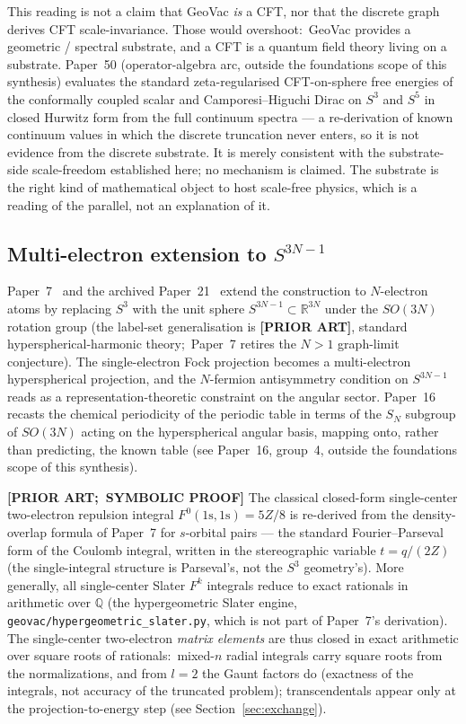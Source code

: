 \documentclass[aps,pra,twocolumn,superscriptaddress,longbibliography]{revtex4-2}
\newcommand{\gvq}[2]{#2}
\newcommand{\gvc}[2]{#2}
\begin{document}
This reading is not a claim that GeoVac \emph{is} a CFT, nor that the
discrete graph derives CFT scale-invariance.  Those would overshoot:\
GeoVac provides a geometric / spectral substrate, and a CFT is a
quantum field theory living on a substrate.  Paper~50 (operator-algebra
arc, outside the foundations scope of this synthesis) evaluates the
standard zeta-regularised CFT-on-sphere free energies of the conformally
coupled scalar and Camporesi--Higuchi Dirac on $S^3$ and $S^5$ in closed
Hurwitz form from the full continuum spectra --- a re-derivation of known
continuum values in which the discrete truncation never enters, so it is
not evidence from the discrete substrate.  It is merely consistent with
the substrate-side scale-freedom established here; no mechanism is claimed.
The substrate is the right kind of mathematical object to host
scale-free physics, which is a reading of the parallel, not an
explanation of it.

\subsection*{Multi-electron extension to $S^{3N-1}$}

Paper~7~\cite{loutey_paper7} and the archived Paper~21~\cite{loutey_paper21}
extend the construction to $N$-electron atoms by replacing $S^3$ with
the unit sphere $S^{3N-1} \subset \mathbb{R}^{3N}$ under the
$SO(3N)$ rotation group (the label-set generalisation is
\textbf{[PRIOR ART]}, standard hyperspherical-harmonic theory;\ Paper~7
retires the $N > 1$ graph-limit conjecture).  The single-electron Fock projection becomes
a multi-electron hyperspherical projection, and the $N$-fermion
antisymmetry condition on $S^{3N-1}$ reads as a representation-theoretic
constraint on the angular sector.  Paper~16 recasts the chemical
periodicity of the periodic table in terms of the $S_N$ subgroup of
$SO(3N)$ acting on the hyperspherical angular basis, mapping onto,
rather than predicting, the known table (see Paper~16, group~4,
outside the foundations scope of this synthesis).

\textbf{[PRIOR ART;\ SYMBOLIC PROOF]} \gvc{p7-parseval-f0}{The classical closed-form
single-center two-electron repulsion integral
$F^0(\text{1s}, \text{1s}) = \gvq{slater_f0_1s}{5Z/8}$ is re-derived from the density-overlap
formula of Paper~7 for $s$-orbital pairs --- the standard Fourier--Parseval
form of the Coulomb integral, written in the stereographic variable
$t = q/(2Z)$ (the single-integral structure is Parseval's, not the $S^3$
geometry's)}.  More
generally, all single-center Slater $F^k$ integrals reduce to exact
rationals in arithmetic over $\mathbb{Q}$ (the hypergeometric Slater
engine, \texttt{geovac/hypergeometric\_slater.py}, which is not part
of Paper~7's derivation).  The single-center two-electron
\emph{matrix elements} are thus closed in exact arithmetic over square roots of rationals:\
mixed-$n$ radial integrals carry square roots from the normalizations, and from $l=2$ the Gaunt
factors do (exactness
of the integrals, not accuracy of the truncated problem); transcendentals appear only at
the projection-to-energy step (see Section~\ref{sec:exchange}).
\end{document}
